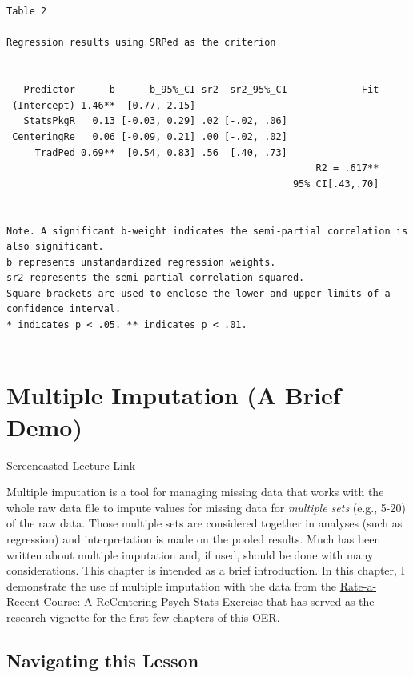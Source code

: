 \documentclass[
  11pt,
]{book}
\begin{document}
\begin{verbatim}


Table 2 

Regression results using SRPed as the criterion
 

   Predictor      b      b_95%_CI sr2  sr2_95%_CI             Fit
 (Intercept) 1.46**  [0.77, 2.15]                                
   StatsPkgR   0.13 [-0.03, 0.29] .02 [-.02, .06]                
 CenteringRe   0.06 [-0.09, 0.21] .00 [-.02, .02]                
     TradPed 0.69**  [0.54, 0.83] .56  [.40, .73]                
                                                      R2 = .617**
                                                  95% CI[.43,.70]
                                                                 

Note. A significant b-weight indicates the semi-partial correlation is also significant.
b represents unstandardized regression weights. 
sr2 represents the semi-partial correlation squared.
Square brackets are used to enclose the lower and upper limits of a confidence interval.
* indicates p < .05. ** indicates p < .01.
 
\end{verbatim}

\hypertarget{multimp}{%
\chapter{Multiple Imputation (A Brief Demo)}\label{multimp}}

\href{https://spu.hosted.panopto.com/Panopto/Pages/Viewer.aspx?pid=94d59efe-3f02-4c65-b068-ad01003e09a9}{Screencasted Lecture Link}

Multiple imputation is a tool for managing missing data that works with the whole raw data file to impute values for missing data for \emph{multiple sets} (e.g., 5-20) of the raw data. Those multiple sets are considered together in analyses (such as regression) and interpretation is made on the pooled results. Much has been written about multiple imputation and, if used, should be done with many considerations. This chapter is intended as a brief introduction. In this chapter, I demonstrate the use of multiple imputation with the data from the \href{https://spupsych.az1.qualtrics.com/jfe/form/SV_b2cClqAlLGQ6nLU}{Rate-a-Recent-Course: A ReCentering Psych Stats Exercise} that has served as the research vignette for the first few chapters of this OER.

\hypertarget{navigating-this-lesson-3}{%
\section{Navigating this Lesson}\label{navigating-this-lesson-3}}
\end{document}
